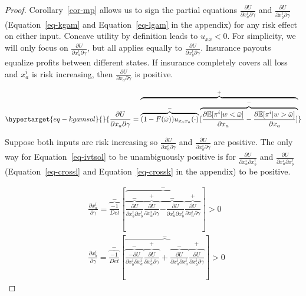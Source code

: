 \documentclass[
  letterpaper,
  DIV=11,
  numbers=noendperiod]{scrartcl}
\theoremstyle{plain}
\theoremstyle{plain}
\theoremstyle{remark}
\begin{document}
\begin{proof}

Corollary~\ref{cor-mp} allows us to sign the partial equations
\(\frac{\partial U}{\partial x^i_a\partial \gamma}\) and
\(\frac{\partial U}{\partial x^i_b\partial \gamma}\)
(Equation~\ref{eq-kgam} and Equation~\ref{eq-lgam} in the appendix) for
any risk effect on either input. Concave utility by definition leads to
\(u_{xx}<0\). For simplicity, we will only focus on
\(\frac{\partial U}{\partial x^i_a\partial \gamma}\), but all applies
equally to \(\frac{\partial U}{\partial x^i_b\partial \gamma}\).
Insurance payouts equalize profits between different states. If
insurance completely covers all loss and \(x^i_a\) is risk increasing,
then \(\frac{\partial U}{\partial x_a\partial \gamma}\) is positive.

\begin{equation}\protect\hypertarget{eq-kgamsol}{}{
\frac{\partial U}{\partial x_a \partial \gamma}=\overbrace{\overbrace{(1-F(\bar\omega))u_{x_ax_a}(\cdot)}^{-}\overbrace{[\frac{\partial \mathbb{E}[\pi^i|w<\bar\omega]}{\partial x_a}-\frac{\partial \mathbb{E}[\pi^i|w>\bar\omega]}{\partial x_a}]}^{-}}^{+}
}\label{eq-kgamsol}\end{equation}

Suppose both inputs are risk increasing so
\(\frac{\partial U}{\partial x^i_a\partial \gamma}\) and
\(\frac{\partial U}{\partial x^i_b\partial \gamma}\) are positive. The
only way for Equation~\ref{eq-ivtsol} to be unambiguously positive is
for \(\frac{\partial U}{\partial x^i_a\partial x^i_b}\) and
\(\frac{\partial U}{\partial x^i_a\partial x^i_b}\)
(Equation~\ref{eq-crossl} and Equation~\ref{eq-crossk} in the appendix)
to be positive.

\[
\begin{aligned}
&\frac{\partial x^i_a}{\partial \gamma}=\overbrace{\frac{-1}{Det}}^{-}\left[\overbrace{\overbrace{\frac{\partial U}{\partial x^i_b \partial x^i_b}}^{-}\overbrace{\frac{\partial U}{\partial x^i_a \partial \gamma}}^{+}\overbrace{-\frac{\partial U}{\partial x^i_a \partial x^i_b}}^{-}\overbrace{\frac{\partial U}{\partial x^i_a \partial \gamma}}^{+}}^{-}\right] >0\\
&\frac{\partial x^i_b}{\partial \gamma}=\overbrace{\frac{-1}{Det}}^{-}\left[\overbrace{\overbrace{\frac{-\partial U}{\partial x^i_b \partial x^i_a}}^{-}\overbrace{\frac{\partial U}{\partial x^i_a \partial \gamma}}^{+}+\overbrace{\frac{\partial U}{\partial x^i_a \partial x^i_a}}^{-}\overbrace{\frac{\partial U}{\partial x^i_b \partial \gamma}}^{+}}^{-}\right]>0
\end{aligned}
\]


\end{proof}
\end{document}
